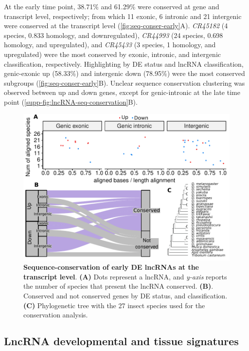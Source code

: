At the early time point, 38.71\% and 61.29\% were conserved at gene and transcript level, respectively; from which 11 exonic, 6 intronic and 21 intergenic were conserved at the transcript level (\autoref{fig:seq-conser-early}A). \textit{CR45182} (4 species, 0.833 homology, and downregulated), \textit{CR44993} (24 species, 0.698 homology, and upregulated), and \textit{CR45433} (3 species, 1 homology, and upregulated) were the most conserved by exonic, intronic, and intergenic classification, respectively. Highlighting by DE status and lncRNA classification, genic-exonic up (58.33\%) and intergenic down (78.95\%) were the most conserved subgroups (\autoref{fig:seq-conser-early}B). Unclear sequence conservation clustering was observed between up and down genes, except for genic-intronic at the late time point (\autoref{supp-fig:lncRNA-seq-conservation}B).

\begin{figure}[ht!]
  \centering
  \includegraphics[scale=0.75]{plots/results/dme/seq.by.exon.pdf}
  \caption[Sequence-conservation of early DE lncRNAs at the transcript level]{\textbf{Sequence-conservation of early DE lncRNAs at the transcript level}. \textbf{(A)} Dots represent a lncRNA, and \textit{y-axis} reports the number of species that present the lncRNA conserved. \textbf{(B)}. Conserved and not conserved genes by DE status, and classification. \textbf{(C)} Phylogenetic tree with the 27 insect species used for the conservation analysis.}
  \label{fig:seq-conser-early}
\end{figure}

\clearpage

\subsection{LncRNA developmental and tissue signatures}
\label{sec:dme-results-second-part}


